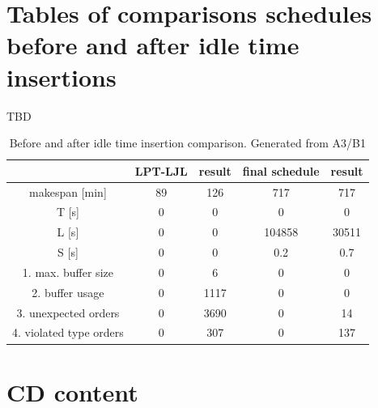 \documentclass{ctuthesis}
\begin{document}
\chapter{Tables of comparisons schedules before and after idle time insertions}
TBD
\begin{table}[H]
\begin{tabular}{ |c|| c | c | c | c |} 
\hline
 & LPT-LJL & result & final schedule & result \\ 
\hline
makespan [min] & 89 & 126 & 717 & 717 \\
\hline
T [s]& 0 & 0 & 0 & 0 \\
\hline
L [s]& 0 & 0 & 104858 & 30511 \\
\hline
S [s]& 0 & 0 & 0.2 & 0.7 \\
\hline
1. max. buffer size & 0 & 6 & 0 & 0\\ 
\hline
2. buffer usage  & 0 & 1117 & 0 & 0\\ 
\hline
3. unexpected orders & 0 & 3690 & 0 & 14\\ 
\hline
4. violated type orders & 0 & 307 & 0 & 137\\ 
\hline
\end{tabular}
\caption{Before and after idle time insertion comparison. Generated from A3/B1}
\end{table}

\chapter{CD content}
\end{document}

